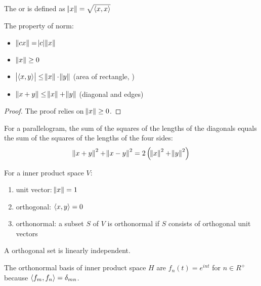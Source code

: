 \begin{definition}[Norm]
    The  or  is defined as $\norm{x} = \sqrt{\left\langle \displaystyle x, x \right\rangle}$    
\end{definition}


\begin{theorem}
    The property of norm:
    \begin{itemize}
    \item $\norm{cx} = \abs{c} \norm{x}$
    \item $\norm{x} \geq 0$
    \item $\abs{\left\langle \displaystyle x, y \right\rangle} \leq \norm{x} \cdot \norm{y}$ (area of rectangle, )
    \item $\norm{x+y} \leq \norm{x} + \norm{y}$ (diagonal and edges)
    \end{itemize}
\end{theorem}

\begin{proof}
    The proof relies on $\norm{x} \geq 0$.
\end{proof}




\begin{theorem}
    For a parallelogram, the sum of the squares of the lengths of the diagonals equals the sum of the squares of the lengths of the four sides:
    \begin{equation}
        \norm{x + y}^2 + \norm{x-y}^2 = 2 \left(\norm{x}^2 + \norm{y}^2\right)
    \end{equation}    
\end{theorem}


\begin{definition}
    For a inner product space $V$:
    \begin{enumerate}
        \item unit vector: $\norm{x} =1$
        \item orthogonal: $\left\langle \displaystyle x, y \right\rangle = 0$
        \item orthonormal: a subset $S$ of $V$ is orthonormal if $S$ consists of orthogonal unit vectors
    \end{enumerate}
\end{definition}

A orthogonal set is linearly independent.

The orthonormal basis of inner product space $H$ are $f_n(t) = e^{int}$ for $n \in R^+$ because $\left\langle \displaystyle f_m, f_n \right\rangle = \delta_{mn} $.

